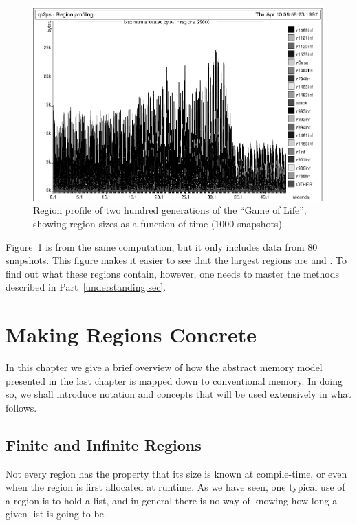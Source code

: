 \documentclass[12pt]{book}
\begin{document}
\begin{figure}
\begin{center}
\includegraphics{life1000.ps}
\end{center}
\caption{Region profile of two hundred 
generations of the ``Game of Life'', showing
region sizes as a function of time (1000 snapshots).}
\label{lifeprof1000.fig}
\end{figure}

Figure~\ref{lifeprof1000.fig} is from the same computation, but it only includes
data from 80 snapshots. This figure makes it easier to see that the largest
regions are  and . To find out what these regions contain,
however, one needs to master the methods described in Part~\ref{understanding.sec}.


\chapter{Making Regions Concrete}
In this chapter we give a brief overview of how the abstract
memory model presented in the last chapter is mapped down to conventional
memory. In doing so, we shall introduce notation and concepts that will be
used extensively in what follows.

\section{Finite and Infinite Regions}
\label{fininf.sec}
Not every region has the property that its size is known at compile-time, 
or even when the region is first allocated at runtime. 
As we have seen, one typical use of a region is to hold
a list, and in general there is no way of knowing how long a given list
is going to be. 
\end{document}

